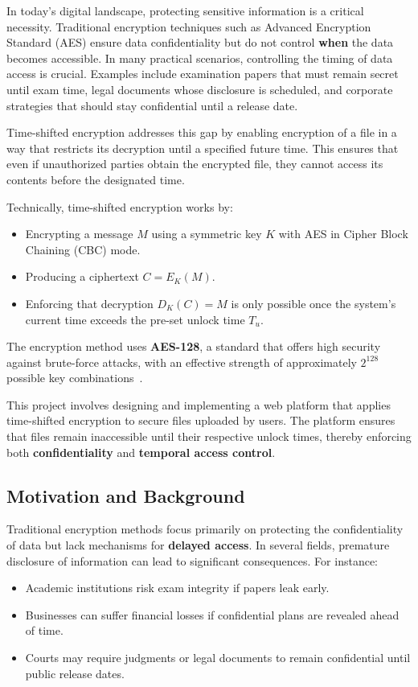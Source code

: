 \documentclass[12pt]{article}
\begin{document}
In today’s digital landscape, protecting sensitive information is a critical necessity. Traditional encryption techniques such as Advanced Encryption Standard (AES) ensure data confidentiality but do not control \textbf{when} the data becomes accessible. In many practical scenarios, controlling the timing of data access is crucial. Examples include examination papers that must remain secret until exam time, legal documents whose disclosure is scheduled, and corporate strategies that should stay confidential until a release date.

Time-shifted encryption addresses this gap by enabling encryption of a file in a way that restricts its decryption until a specified future time. This ensures that even if unauthorized parties obtain the encrypted file, they cannot access its contents before the designated time.

Technically, time-shifted encryption works by:
\begin{itemize}
    \item Encrypting a message \( M \) using a symmetric key \( K \) with AES in Cipher Block Chaining (CBC) mode.
    \item Producing a ciphertext \( C = E_K(M) \).
    \item Enforcing that decryption \( D_K(C) = M \) is only possible once the system’s current time exceeds the pre-set unlock time \( T_u \).
\end{itemize}

The encryption method uses \textbf{AES-128}, a standard that offers high security against brute-force attacks, with an effective strength of approximately \( 2^{128} \) possible key combinations~\cite{nist}.

This project involves designing and implementing a web platform that applies time-shifted encryption to secure files uploaded by users. The platform ensures that files remain inaccessible until their respective unlock times, thereby enforcing both \textbf{confidentiality} and \textbf{temporal access control}.

\subsection{Motivation and Background}

Traditional encryption methods focus primarily on protecting the confidentiality of data but lack mechanisms for \textbf{delayed access}. In several fields, premature disclosure of information can lead to significant consequences. For instance:
\begin{itemize}
    \item Academic institutions risk exam integrity if papers leak early.
    \item Businesses can suffer financial losses if confidential plans are revealed ahead of time.
    \item Courts may require judgments or legal documents to remain confidential until public release dates.
\end{itemize}
\end{document}
